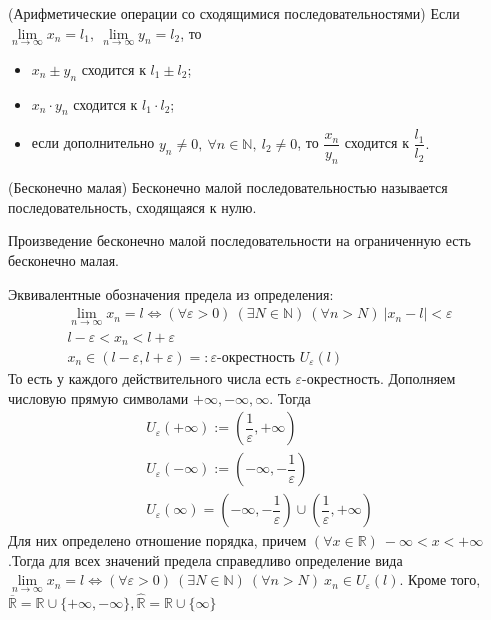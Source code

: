 \begin{multicols}{2}
\begin{theorema}{(Арифметические операции со сходящимися последовательностями)}{}
    Если $\lim\limits_{n\to\infty} x_n = l_1, \ \lim\limits_{n\to\infty} y_n = l_2$, то \begin{itemize}
		\item $x_n \pm y_n$ сходится к $l_1\pm l_2$;
		\item $x_n \cdot y_n$ сходится к $l_1 \cdot l_2$;
		\item если дополнительно $y_n \neq 0, \ \forall n \in \mathbb N, \ l_2\neq 0$, то $\dfrac{x_n}{y_n}$ сходится к $\dfrac{l_1}{l_2}.$
\end{itemize}
\end{theorema}
\begin{definition}{(Бесконечно малая)}{}
    Бесконечно малой последовательностью называется последовательность, сходящаяся к нулю.    
\end{definition}
\begin{theorema}{}{}
    Произведение бесконечно малой последовательности на ограниченную есть бесконечно малая.
\end{theorema}
Эквивалентные обозначения предела из определения: 
\[	
    \begin{array}{c}
        \lim\limits_{n\to\infty} x_n = l \Leftrightarrow (\forall \varepsilon > 0)\ (\exists N \in\mathbb N)\ (\forall n > N)\ |x_n - l| < \varepsilon\\l-\varepsilon < x_n < l + \varepsilon\\x_n \in (l-\varepsilon, l + \varepsilon) =: \text{$\varepsilon$-окрестность } U_\varepsilon(l)
    \end{array}
\]
То есть у каждого действительного числа есть $\varepsilon$-окрестность. Дополняем числовую прямую символами $+\infty, -\infty, \infty.$ Тогда
\[ \begin{array}{c}
     U_\varepsilon(+\infty) := (\dfrac{1}{\varepsilon}, +\infty)\\U_\varepsilon(-\infty) := (-\infty, -\dfrac{1}{\varepsilon})\\U_\varepsilon(\infty) = (-\infty, -\dfrac{1}{\varepsilon})\cup (\dfrac{1}{\varepsilon}, +\infty)
    \end{array}
\]
Для них определено отношение порядка, причем $(\forall x \in\mathbb R)\ -\infty < x < +\infty$.Тогда для всех значений предела справедливо определение вида $\lim\limits_{n\to\infty} x_n = l \Leftrightarrow (\forall \varepsilon > 0)\ (\exists N \in\mathbb N)\ (\forall n >N)\ x_n\in U_\varepsilon(l)$. Кроме того, $\overline{\mathbb R} = \mathbb R \cup \{+\infty, -\infty\}, \hat{\mathbb R} = \mathbb R \cup \{\infty\}$

\end{multicols}
